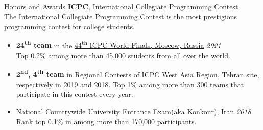 \documentclass{resume} %
\begin{document}
\begin{rSection}{Honors and Awards} \itemsep -2pt
	{\bf ICPC}, International Collegiate Programming Contest\\
	The International Collegiate Programming Contest is the most prestigious programming contest for college students.
	\begin{itemize}[leftmargin=*, label=\raisebox{0.25ex}{\tiny$\bullet$}]
		\item
		{\bf 24\textsuperscript{th} team} in the \href{https://icpc.global/community/results-2020}{44\textsuperscript{th} ICPC World Finals, Moscow, Russia} 
		\hfill {\em 2021}\\
		Top 0.2\% among more than 45,000 students from all over the world.
		\item
		{\bf 2\textsuperscript{nd}, 4\textsuperscript{th}
			team} in Regional Contests of ICPC West Asia Region, Tehran site, respectively in \href{http://icpc.sharif.edu/2019/scoreboard/}{2019} and \href{http://icpc.sharif.edu/2018/scoreboard/}{2018}.
		Top 1\% among more than 300 teams that participate in this contest every year.
		\item National Countrywide University Entrance Exam(aka Konkour), Iran \hfill {\em 2018}\\
		Rank top 0.1\% in among more than 170,000 participants.
	\end{itemize}
\end{rSection}
\end{document}
